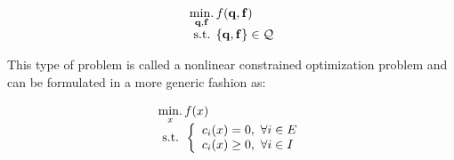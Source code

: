 
\begin{equation}
  \begin{array}{l}
    \operatorname*{min.}\limits_{\mathbf{q}, \mathbf{f}}{f(\mathbf{q}, \mathbf{f})}\\
    \text{ s.t. }\{\mathbf{q}, \mathbf{f}\}\in\mathcal{Q}
  \end{array}
\end{equation}

This type of problem is called a nonlinear constrained optimization problem and can be formulated in a more generic fashion as:

\begin{equation}
\label{eq:optim_form_PG}
  \begin{array}{l}
    \operatorname*{min.}\limits_{x}{f(x)}\\
    \text{ s.t. }
    \left\{
    \begin{array}{l}
      c_i(x) = 0,\ \forall i\in{E}\\
      c_i(x) \geq 0,\ \forall i\in{I}\\
    \end{array}
    \right.
  \end{array}
\end{equation}

